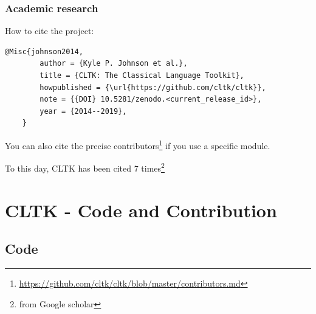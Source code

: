 \documentclass{beamer}
\begin{document}
\begin{frame}[fragile]
\frametitle{Academic research}

    How to cite the project:
    \begin{lstlisting}[basicstyle=\scriptsize,frame=single]
    @Misc{johnson2014,
        author = {Kyle P. Johnson et al.},
        title = {CLTK: The Classical Language Toolkit},
        howpublished = {\url{https://github.com/cltk/cltk}},
        note = {{DOI} 10.5281/zenodo.<current_release_id>},
        year = {2014--2019},
    }
    \end{lstlisting}
    You can also cite the precise contributors\footnote{\href{https://github.com/cltk/cltk/blob/master/contributors.md}{https://github.com/cltk/cltk/blob/master/contributors.md}} if you use a specific module.
    
    To this day, CLTK has been cited 7 times\footnote{from Google scholar}
\end{frame}

\section{CLTK - Code and Contribution}



\subsection{Code}
\end{document}

